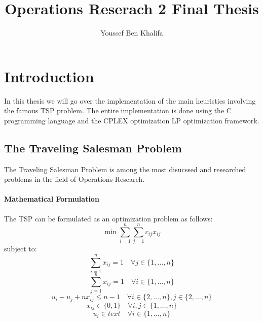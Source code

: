 \documentclass{article}
\title{Operations Reserach 2 Final Thesis}
\author{Youssef Ben Khalifa}
\begin{document}
\maketitle

\section{Introduction}

In this thesis we will go over the implementation of the main heuristics involving the famous TSP problem. The entire implementation is done using the C programming language and the CPLEX optimization LP optimization framework. 
\subsection{The Traveling Salesman Problem}
The Traveling Salesman Problem is among the most disucssed and researched problems in the field of Operations Research.

\paragraph{Mathematical Formulation}
The TSP can be formulated as an optimization problem as follows:
\begin{equation}
    \min \sum_{i=1}^{n} \sum_{j=1}^{n} c_{ij} x_{ij}
\end{equation}
subject to:
\begin{equation}
    \sum_{i=1}^{n} x_{ij} = 1 \quad \forall j \in \{1, \ldots, n\}
\end{equation}
\begin{equation}
    \sum_{j=1}^{n} x_{ij} = 1 \quad \forall i \in \{1, \ldots, n\}
\end{equation}
\begin{equation}
    u_i - u_j + nx_{ij} \leq n-1 \quad \forall i \in \{2, \ldots, n\}, j \in \{2, \ldots, n\}
\end{equation}
\begin{equation}
    x_{ij} \in \{0, 1\} \quad \forall i, j \in \{1, \ldots, n\}
\end{equation}
\begin{equation}
    u_i \in \mathit{text} \quad \forall i \in \{1, \ldots, n\}
\end{equation}
\end{document}
